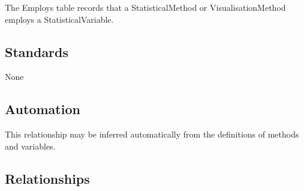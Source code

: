 The Employs table records that a StatisticalMethod or
VisualisationMethod employs a StatisticalVariable.

\subsection{Standards}\label{standards-14}

None

\subsection{Automation}\label{automation-14}

This relationship may be inferred automatically from the definitions of
methods and variables.

\subsection{Relationships}\label{relationships-10}

